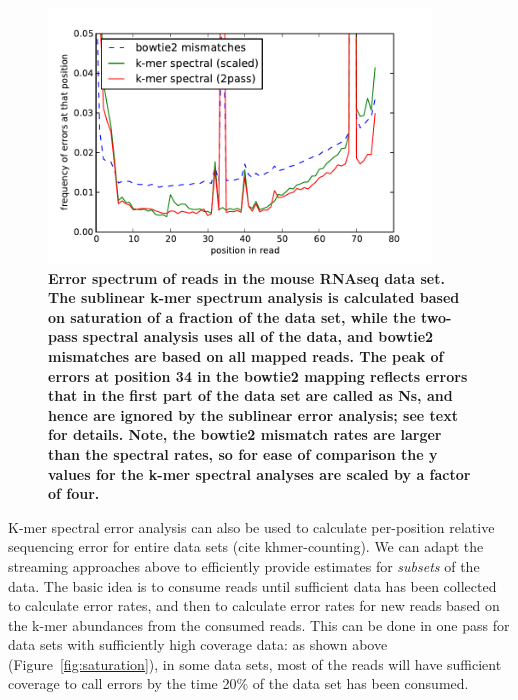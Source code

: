 \documentclass{article}
\begin{document}
\begin{figure}[!ht]
 \centerline{\includegraphics[width=4in]{./figures/rseq-errhist}}
\caption{{\bf Error spectrum of reads in the mouse RNAseq data set.
    The sublinear k-mer spectrum analysis is calculated based on
    saturation of a fraction of the data set, while the two-pass
    spectral analysis uses all of the data, and bowtie2 mismatches are
    based on all mapped reads.  The peak of errors at position 34 in
    the bowtie2 mapping reflects errors that in the first part of the
    data set are called as Ns, and hence are ignored by the sublinear
    error analysis; see text for details. Note, the bowtie2 mismatch
    rates are larger than the spectral rates, so for ease of
    comparison the y values for the k-mer spectral analyses are scaled
    by a factor of four.}}
\label{fig:rseq_err}
\end{figure}


K-mer spectral error analysis can also be used to calculate
per-position relative sequencing error for entire data sets (cite
khmer-counting).  We can adapt the streaming approaches above to
efficiently provide estimates for {\em subsets} of the data.  The
basic idea is to consume reads until sufficient data has been
collected to calculate error rates, and then to calculate error rates
for new reads based on the k-mer abundances from the consumed reads.
This can be done in one pass for data sets with sufficiently high
coverage data: as shown above (Figure~\ref{fig:saturation}), in some
data sets, most of the reads will have sufficient coverage to call
errors by the time 20\% of the data set has been consumed.
\end{document}
